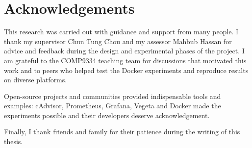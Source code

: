 \chapter*{Acknowledgements}\label{ack}

This research was carried out with guidance and support from many
people.  I thank my supervisor Chun Tung Chou and my assessor Mahbub Hassan for advice and feedback during the
design and experimental phases of the project.  I am grateful to the
COMP9334 teaching team for discussions that motivated this work and to
peers who helped test the Docker experiments and reproduce results on
diverse platforms.

Open-source projects and communities provided indispensable tools and
examples: cAdvisor, Prometheus, Grafana, Vegeta and Docker made the
experiments possible and their developers deserve acknowledgement.

Finally, I thank friends and family for their patience during the
writing of this thesis.
